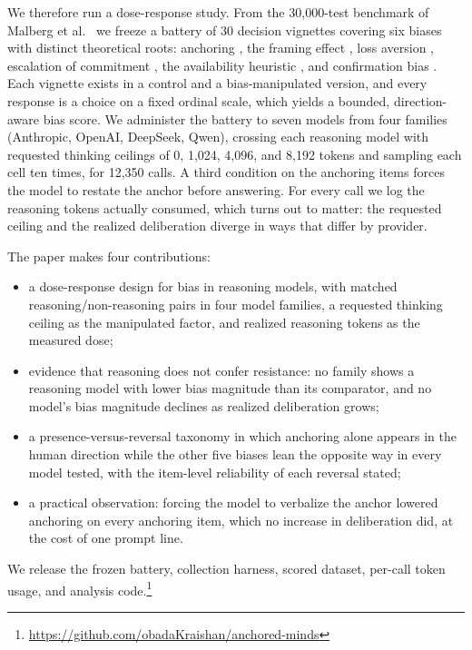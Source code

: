 \documentclass[conference]{IEEEtran}
\begin{document}
We therefore run a dose-response study. From the 30,000-test benchmark of Malberg et al.~\cite{malberg2024comprehensive} we freeze a battery of 30 decision vignettes covering six biases with distinct theoretical roots: anchoring \cite{tversky1974judgment}, the framing effect \cite{tversky1981framing}, loss aversion \cite{kahneman1979prospect}, escalation of commitment \cite{staw1976kneedeep}, the availability heuristic \cite{tversky1973availability}, and confirmation bias \cite{nickerson1998confirmation}. Each vignette exists in a control and a bias-manipulated version, and every response is a choice on a fixed ordinal scale, which yields a bounded, direction-aware bias score. We administer the battery to seven models from four families (Anthropic, OpenAI, DeepSeek, Qwen), crossing each reasoning model with requested thinking ceilings of 0, 1,024, 4,096, and 8,192 tokens and sampling each cell ten times, for 12,350 calls. A third condition on the anchoring items forces the model to restate the anchor before answering. For every call we log the reasoning tokens actually consumed, which turns out to matter: the requested ceiling and the realized deliberation diverge in ways that differ by provider.

The paper makes four contributions:
\begin{itemize}
\item a dose-response design for bias in reasoning models, with matched reasoning/non-reasoning pairs in four model families, a requested thinking ceiling as the manipulated factor, and realized reasoning tokens as the measured dose;
\item evidence that reasoning does not confer resistance: no family shows a reasoning model with lower bias magnitude than its comparator, and no model's bias magnitude declines as realized deliberation grows;
\item a presence-versus-reversal taxonomy in which anchoring alone appears in the human direction while the other five biases lean the opposite way in every model tested, with the item-level reliability of each reversal stated;
\item a practical observation: forcing the model to verbalize the anchor lowered anchoring on every anchoring item, which no increase in deliberation did, at the cost of one prompt line.
\end{itemize}
We release the frozen battery, collection harness, scored dataset, per-call token usage, and analysis code.\footnote{\url{https://github.com/obadaKraishan/anchored-minds}}
\end{document}

